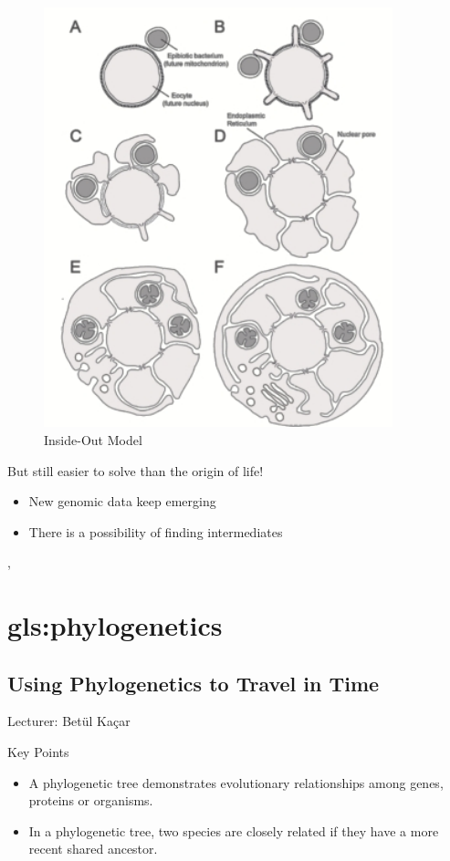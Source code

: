 \documentclass[]{article}
\begin{document}
\begin{figure}[H]
	\caption{Inside-Out Model}\label{fig:inside:out}
	\includegraphics[width=0.9\textwidth]{InsideOut}
\end{figure}

But still easier to solve than the origin of life!
\begin{itemize}
	\item New genomic data keep emerging
	\item There is a possibility of finding intermediates
\end{itemize}

\cite{javaux2003recognizing},  

\section{\Gls{gls:phylogenetics}}


\subsection{Using Phylogenetics to Travel in Time}
Lecturer: Bet{\"u}l Ka{\c c}ar

Key Points
\begin{itemize}
	\item A phylogenetic tree demonstrates evolutionary
	relationships among genes, proteins or organisms.
	\item In a phylogenetic tree, two species are closely
	related if they have a more recent shared ancestor.
\end{itemize}
\end{document}

